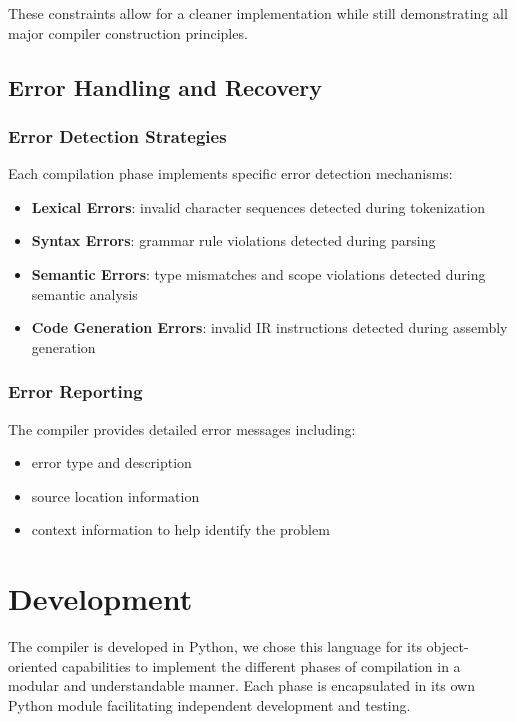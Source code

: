 \documentclass[12pt, letterpaper]{article}
\begin{document}
These constraints allow for a cleaner implementation while still demonstrating all major compiler construction principles.

\subsection*{Error Handling and Recovery}

\subsubsection*{Error Detection Strategies}

Each compilation phase implements specific error detection mechanisms:

\begin{itemize}
    \item \textbf{Lexical Errors}: invalid character sequences detected during tokenization
    \item \textbf{Syntax Errors}: grammar rule violations detected during parsing
    \item \textbf{Semantic Errors}: type mismatches and scope violations detected during semantic analysis
    \item \textbf{Code Generation Errors}: invalid IR instructions detected during assembly generation
\end{itemize}

\subsubsection*{Error Reporting}

The compiler provides detailed error messages including:

\begin{itemize}
    \item error type and description
    \item source location information
    \item context information to help identify the problem
\end{itemize}

\section{Development}

The compiler is developed in Python, we chose this language for its object-oriented capabilities to implement the different phases of compilation in a modular and understandable manner. Each phase is encapsulated in its own Python module facilitating independent development and testing.
\end{document}
